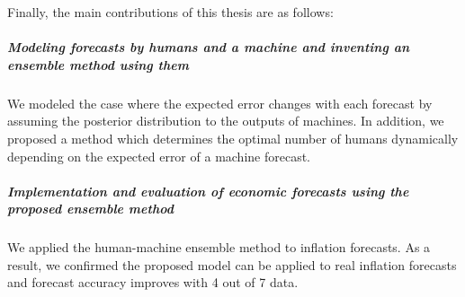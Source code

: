 \documentclass[../main.tex]{subfiles}
\begin{document}
Finally, the main contributions of this thesis are as follows:

\subparagraph{Modeling forecasts by humans and a machine and inventing an ensemble method using them}
We modeled the case where the expected error changes with each forecast by assuming the posterior distribution to the outputs of machines.
In addition, we proposed a method which determines the optimal number of humans dynamically depending on the expected error of a machine forecast.

\subparagraph{Implementation and evaluation of economic forecasts using the proposed ensemble method}
We applied the human-machine ensemble method to inflation forecasts.
As a result, we confirmed the proposed model can be applied to real inflation forecasts and forecast accuracy improves with 4 out of 7 data.
\end{document}
